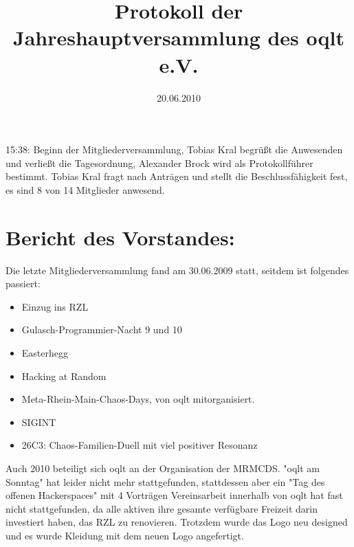 \documentclass[parskip]{scrartcl}
\begin{document}
\title{Protokoll der Jahreshauptversammlung des oqlt e.V.}
\date{20.06.2010}
\maketitle

\newcommand\MV{Mitgliederversammlung}

\tableofcontents
\hspace{1em}

15:38: Beginn der Mitgliederversammlung, Tobias Kral begrüßt die Anwesenden und verließt die Tagesordnung,
Alexander Brock wird als Protokollführer bestimmt. Tobias Kral fragt nach Anträgen und stellt die Beschlussfähigkeit fest,
es sind 8 von 14 Mitglieder anwesend.

\section{Bericht des Vorstandes:} {

Die letzte Mitgliederversammlung fand am 30.06.2009 statt, seitdem ist folgendes passiert:
\begin{itemize}
\item Einzug ins RZL
\item Gulasch-Programmier-Nacht 9 und 10
\item Easterhegg
\item Hacking at Random
\item Meta-Rhein-Main-Chaos-Days, von oqlt mitorganisiert.
\item SIGINT
\item 26C3: Chaos-Familien-Duell mit viel positiver Resonanz
\end{itemize}

Auch 2010 beteiligt sich oqlt an der Organisation der MRMCDS.
"oqlt am Sonntag" hat leider nicht mehr stattgefunden,
stattdessen aber ein "Tag des offenen Hackerspaces" mit 4 Vorträgen
Vereinsarbeit innerhalb von oqlt hat fast nicht stattgefunden,
da alle aktiven ihre gesamte verfügbare Freizeit darin investiert haben,
das RZL zu renovieren. Trotzdem wurde das Logo neu designed
und es wurde Kleidung mit dem neuen Logo angefertigt.

}
\end{document}

